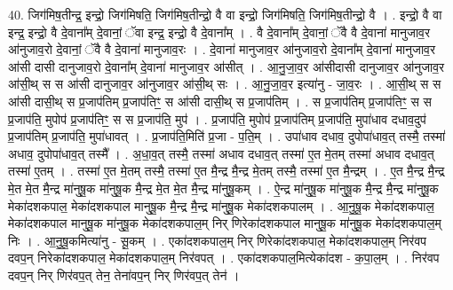 \documentclass[17pt]{extarticle}
\begin{document}
40. जिग॑मिष॒तीन्द्र॒ इन्द्रो॒ जिग॑मिषति॒ जिग॑मिष॒तीन्द्रो॒ वै वा इन्द्रो॒ जिग॑मिषति॒ जिग॑मिष॒तीन्द्रो॒ वै । . इन्द्रो॒ वै वा इन्द्र॒ इन्द्रो॒ वै दे॒वाना᳚म् दे॒वानां॒ ॅवा इन्द्र॒ इन्द्रो॒ वै दे॒वाना᳚म् । . वै दे॒वाना᳚म् दे॒वानां॒ ॅवै वै दे॒वाना॑ मानुजाव॒र आ॑नुजाव॒रो दे॒वानां॒ ॅवै वै दे॒वाना॑ मानुजाव॒रः । . दे॒वाना॑ मानुजाव॒र आ॑नुजाव॒रो दे॒वाना᳚म् दे॒वाना॑ मानुजाव॒र आ॑सी दासी दानुजाव॒रो दे॒वाना᳚म् दे॒वाना॑ मानुजाव॒र आ॑सीत् । . आ॒नु॒जा॒व॒र आ॑सीदासी दानुजाव॒र आ॑नुजाव॒र आ॑सी॒थ् स स आ॑सी दानुजाव॒र आ॑नुजाव॒र आ॑सी॒थ् सः । . आ॒नु॒जा॒व॒र इत्या॑नु - जा॒व॒रः । . आ॒सी॒थ् स स आ॑सी दासी॒थ् स प्र॒जाप॑तिम् प्र॒जाप॑तिꣳ॒॒ स आ॑सी दासी॒थ् स प्र॒जाप॑तिम् । . स प्र॒जाप॑तिम् प्र॒जाप॑तिꣳ॒॒ स स प्र॒जाप॑ति॒ मुपोप॑ प्र॒जाप॑तिꣳ॒॒ स स प्र॒जाप॑ति॒ मुप॑ । . प्र॒जाप॑ति॒ मुपोप॑ प्र॒जाप॑तिम् प्र॒जाप॑ति॒ मुपा॑धाव दधाव॒दुप॑ प्र॒जाप॑तिम् प्र॒जाप॑ति॒ मुपा॑धावत् । . प्र॒जाप॑ति॒मिति॑ प्र॒जा - प॒ति॒म् । . उपा॑धाव दधाव॒ दुपोपा॑धाव॒त् तस्मै॒ तस्मा॑ अधाव॒ दुपोपा॑धाव॒त् तस्मै᳚ । . अ॒धा॒व॒त् तस्मै॒ तस्मा॑ अधाव दधाव॒त् तस्मा॑ ए॒त मे॒तम् तस्मा॑ अधाव दधाव॒त् तस्मा॑ ए॒तम् । . तस्मा॑ ए॒त मे॒तम् तस्मै॒ तस्मा॑ ए॒त मै॒न्द्र मै॒न्द्र मे॒तम् तस्मै॒ तस्मा॑ ए॒त मै॒न्द्रम् । . ए॒त मै॒न्द्र मै॒न्द्र मे॒त मे॒त मै॒न्द्र मा॑नुषू॒क मा॑नुषू॒क मै॒न्द्र मे॒त मे॒त मै॒न्द्र मा॑नुषू॒कम् । . ऐ॒न्द्र मा॑नुषू॒क मा॑नुषू॒क मै॒न्द्र मै॒न्द्र मा॑नुषू॒क मेका॑दशकपाल॒ मेका॑दशकपाल मानुषू॒क मै॒न्द्र मै॒न्द्र मा॑नुषू॒क मेका॑दशकपालम् । . आ॒नु॒षू॒क मेका॑दशकपाल॒ मेका॑दशकपाल मानुषू॒क मा॑नुषू॒क मेका॑दशकपाल॒म् निर् णिरेका॑दशकपाल मानुषू॒क मा॑नुषू॒क मेका॑दशकपाल॒म् निः । . आ॒नु॒षू॒कमित्या॑नु - सू॒कम् । . एका॑दशकपाल॒म् निर् णिरेका॑दशकपाल॒ मेका॑दशकपाल॒म् निर॑वप दवप॒न् निरेका॑दशकपाल॒ मेका॑दशकपाल॒म् निर॑वपत् । . एका॑दशकपाल॒मित्येका॑दश - क॒पा॒ल॒म् । . निर॑वप दवप॒न् निर् णिर॑वप॒त् तेन॒ तेना॑वप॒न् निर् णिर॑वप॒त् तेन॑ । \newline
\pagebreak
{}
\end{document}
